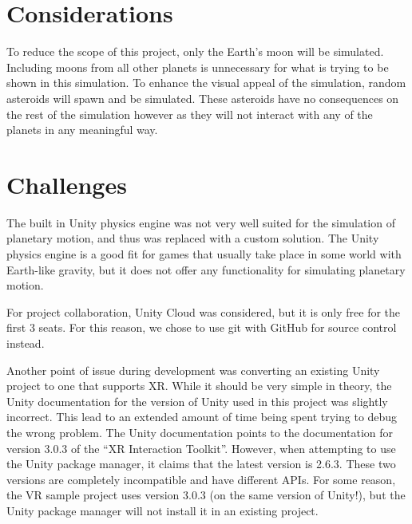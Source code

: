\documentclass{article}
\begin{document}
    \section{Considerations}
    To reduce the scope of this project, only the Earth's moon will be simulated. Including moons from all other planets is unnecessary for what is trying to be shown in this simulation. To enhance the visual appeal of the simulation, random asteroids will spawn and be simulated. These asteroids have no consequences on the rest of the simulation however as they will not interact with any of the planets in any meaningful way.
    \section{Challenges}
    The built in Unity physics engine was not very well suited for the simulation of planetary motion, and thus was replaced with a custom solution. The Unity physics engine is a good fit for games that usually take place in some world with Earth-like gravity, but it does not offer any functionality for simulating planetary motion.

    For project collaboration, Unity Cloud was considered, but it is only free for the first 3 seats. For this reason, we chose to use git with GitHub for source control instead.

    Another point of issue during development was converting an existing Unity project to one that supports XR. While it should be very simple in theory, the Unity documentation for the version of Unity used in this project was slightly incorrect. This lead to an extended amount of time being spent trying to debug the wrong problem. The Unity documentation points to the documentation for version 3.0.3 of the ``XR Interaction Toolkit''. However, when attempting to use the Unity package manager, it claims that the latest version is 2.6.3. These two versions are completely incompatible and have different APIs. For some reason, the VR sample project uses version 3.0.3 (on the same version of Unity!), but the Unity package manager will not install it in an existing project.
    \newpage
    
    
\end{document}
